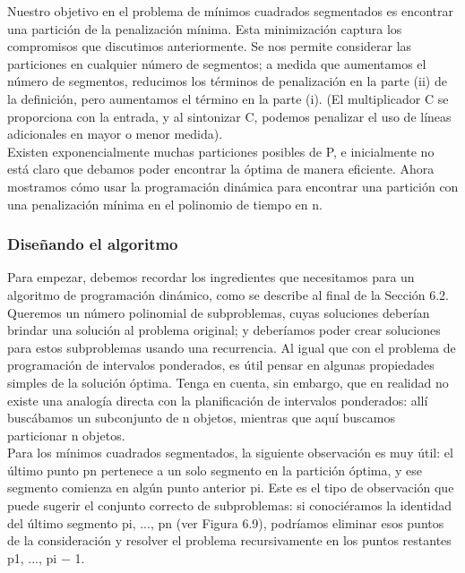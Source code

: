 \documentclass[a4paper, 12pt]{book}
\theoremstyle{dotless}
\begin{document}
Nuestro objetivo en el problema de mínimos cuadrados segmentados es encontrar una partición de la penalización mínima. Esta minimización captura los compromisos que discutimos anteriormente. Se nos permite considerar las particiones en cualquier número de segmentos; a medida que aumentamos el número de segmentos, reducimos los términos de penalización en la parte (ii) de la definición, pero aumentamos el término en la parte (i). (El multiplicador C se proporciona con la entrada, y al sintonizar C, podemos penalizar el uso de líneas adicionales en mayor o menor medida).\\

Existen exponencialmente muchas particiones posibles de P, e inicialmente no está claro que debamos poder encontrar la óptima de manera eficiente. Ahora mostramos cómo usar la programación dinámica para encontrar una partición con una penalización mínima en el polinomio de tiempo en n.\\

\subsubsection*{Diseñando el algoritmo}

Para empezar, debemos recordar los ingredientes que necesitamos para un algoritmo de programación dinámico, como se describe al final de la Sección 6.2. Queremos un número polinomial de subproblemas, cuyas soluciones deberían brindar una solución al problema original; y deberíamos poder crear soluciones para estos subproblemas usando una recurrencia. Al igual que con el problema de programación de intervalos ponderados, es útil pensar en algunas propiedades simples de la solución óptima. Tenga en cuenta, sin embargo, que en realidad no existe una analogía directa con la planificación de intervalos ponderados: allí buscábamos un subconjunto de n objetos, mientras que aquí buscamos particionar n objetos.\\

Para los mínimos cuadrados segmentados, la siguiente observación es muy útil: el último punto pn pertenece a un solo segmento en la partición óptima, y ​​ese segmento comienza en algún punto anterior pi. Este es el tipo de observación que puede sugerir el conjunto correcto de subproblemas: si conociéramos la identidad del último segmento pi, ..., pn (ver Figura 6.9), podríamos eliminar esos puntos de la consideración y resolver el problema recursivamente en los puntos restantes p1, ..., pi − 1.\\
\end{document}
